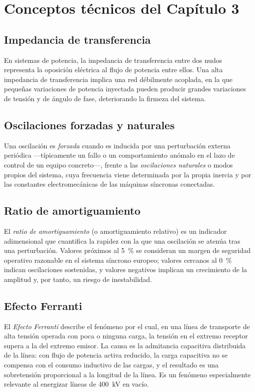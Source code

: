 
\chapter{Conceptos técnicos del Capítulo 3}
\label{anexo:conceptos_cap3}

\section{Impedancia de transferencia}
\label{anexo:impedancia}
En sistemas de potencia, la impedancia de transferencia entre dos nudos representa la oposición eléctrica al flujo de potencia entre ellos. Una alta impedancia de transferencia implica una red débilmente acoplada, en la que pequeñas variaciones de potencia inyectada pueden producir grandes variaciones de tensión y de ángulo de fase, deteriorando la firmeza del sistema.

\section{Oscilaciones forzadas y naturales}
\label{anexo:oscilaciones}
Una oscilación es \textit{forzada} cuando es inducida por una perturbación externa periódica ---típicamente un fallo o un comportamiento anómalo en el lazo de control de un equipo concreto---, frente a las \textit{oscilaciones naturales} o modos propios del sistema, cuya frecuencia viene determinada por la propia inercia y por las constantes electromecánicas de las máquinas síncronas conectadas.

\section{Ratio de amortiguamiento}
\label{anexo:amortiguamiento}
El \textit{ratio de amortiguamiento} (o amortiguamiento relativo) es un indicador adimensional que cuantifica la rapidez con la que una oscilación se atenúa tras una perturbación. Valores próximos al 5~\% se consideran un margen de seguridad operativo razonable en el sistema síncrono europeo; valores cercanos al 0~\% indican oscilaciones sostenidas, y valores negativos implican un crecimiento de la amplitud y, por tanto, un riesgo de inestabilidad.

\section{Efecto Ferranti}
\label{anexo:ferranti}
El \textit{Efecto Ferranti} describe el fenómeno por el cual, en una línea de transporte de alta tensión operada con poca o ninguna carga, la tensión en el extremo receptor supera a la del extremo emisor. La causa es la admitancia capacitiva distribuida de la línea: con flujo de potencia activa reducido, la carga capacitiva no se compensa con el consumo inductivo de las cargas, y el resultado es una sobretensión proporcional a la longitud de la línea. Es un fenómeno especialmente relevante al energizar líneas de 400~kV en vacío.


